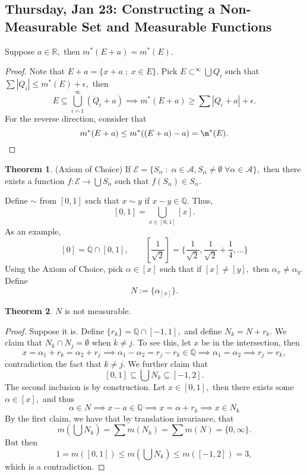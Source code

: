 \documentclass[10pt, oneside]{article}
\newcommand{\bbR}{\mathbb{R}}
\newcommand{\bbQ}{\mathbb{Q}}
\theoremstyle{definition}
\newtheorem{thm}{Theorem}
\begin{document}
\subsection{Thursday, Jan 23: Constructing a Non-Measurable Set and Measurable Functions}
\begin{lemma}
    Suppose $a\in \bbR,$ then $m^\ast (E + a) = m^\ast(E).$
\end{lemma}
\begin{proof}
    Note that $E + a  = \{x + a \; ; \; x\in E\}.$ Pick $E \subset^\infty \bigcup Q_i$ such that $\sum |Q_i| \leq m^\ast(E) + \epsilon,$ then 
    \[E \subseteq \bigcup_{i=1}^\infty (Q_i + a) \implies m^\ast(E + a)  \geq \sum |Q_i + a| + \epsilon.\]
    For the reverse direction, consider that 
    \[m^\ast(E + a) \leq m^\ast((E + a) - a)  = \m^\ast (E).\]
\end{proof}
\begin{thm}
    (Axiom of Choice) If $\mathcal{E} = \{S_\alpha \; : \;  \alpha \in \mathcal{A}, S_\alpha \neq \emptyset \; \forall \alpha \in \mathcal{A}\},$ then there exists a function $f: \mathcal{E} \to \bigcup S_\alpha$ such that $f(S_\alpha) \in S_\alpha.$
\end{thm}
Define $\sim$ from $[0,1]$ such that $x\sim y$ if $x-y \in \bbQ.$ Thus, 
\[[0,1] = \bigcup_{x\in [0,1]} [x].\] As an example, \[[0] = \bbQ \cap [0,1], \qquad [\frac{1}{\sqrt{2}}] = \{\frac{1}{\sqrt{2}}, \frac{1}{\sqrt{2}} + \frac{1}{4}, \dots\}\] Using the Axiom of Choice, pick $\alpha \in [x]$ such that if $[x] \neq [y],$ then $\alpha_x \neq \alpha_y.$ Define 
\[N := \{\alpha_{[x]}\}.\]
\begin{thm}
    $N$ is not measurable.
\end{thm}
\begin{proof}
    Suppose it is. Define $\{r_k\} = \bbQ \cap [-1, 1],$ and define $N_k = N + r_k.$ We claim that $N_k \cap N_j = \emptyset$ when $k\neq j.$ To see this, let $x$ be in the intersection, then 
    \[x = \alpha_1 + r_k = \alpha_2 + r_j \implies \alpha_1 - \alpha_2 = r_j - r_k \in \bbQ \implies \alpha_1 = \alpha_2 \implies r_j = r_k,\] contradiction the fact that $k\neq j.$ We further claim that 
    \[[0,1]\subseteq \bigcup N_k \subseteq [-1, 2].\] The second inclusion is by construction. Let $x\in [0,1],$ then there exists some $\alpha \in [x],$ and thus 
    \[\alpha \in N \implies x-a \in \bbQ \implies x = \alpha + r_k \implies x\in N_k\] By the first claim, we have that by translation invariance, that
    \[m(\bigcup N_k) = \sum m(N_k) = \sum m(N) = \{0, \infty\}.\] But then 
    \[1 = m([0,1])\leq m(\bigcup N_k) \leq m([-1,2]) = 3,\] which is a contradiction.
\end{proof}
\end{document}

